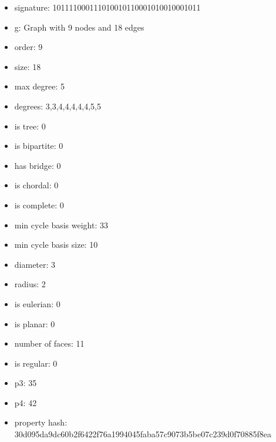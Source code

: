 \newpage
\begin{figure}
\end{figure}
\begin{itemize}
\item signature: 101111000111010010110001010010001011
\item g: Graph with 9 nodes and 18 edges
\item order: 9
\item size: 18
\item max degree: 5
\item degrees: 3,3,4,4,4,4,4,5,5
\item is tree: 0
\item is bipartite: 0
\item has bridge: 0
\item is chordal: 0
\item is complete: 0
\item min cycle basis weight: 33
\item min cycle basis size: 10
\item diameter: 3
\item radius: 2
\item is eulerian: 0
\item is planar: 0
\item number of faces: 11
\item is regular: 0
\item p3: 35
\item p4: 42
\item property hash: 30d095da9dc60b2f6422f76a1994045faba57c9073b5be07c239d0f70885f8ea
\end{itemize}
